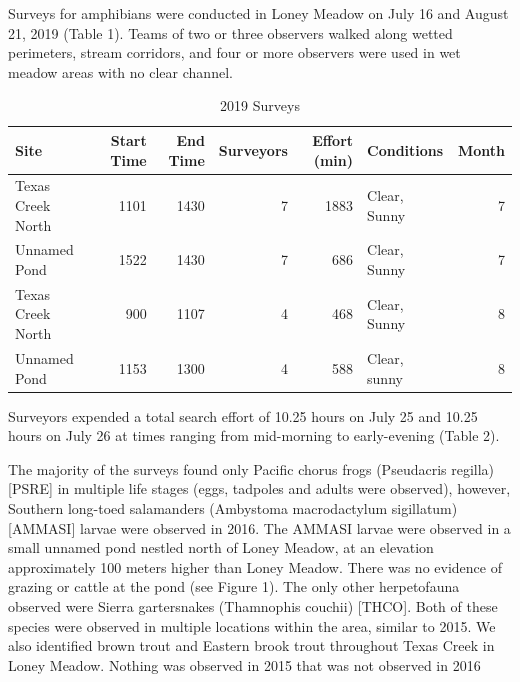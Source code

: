 \documentclass[11pt,a4paper,]{article}
\begin{document}
Surveys for amphibians were conducted in Loney Meadow on July 16 and August 21, 2019 (Table 1). Teams of two or three observers walked along wetted perimeters, stream corridors, and four or more observers were used in wet meadow areas with no clear channel.

\begin{table}

\caption{\label{tab:table1}2019 Surveys}
\centering
\begin{tabular}[t]{l|r|r|r|r|l|r}
\hline
Site & Start Time & End Time & Surveyors & Effort (min) & Conditions & Month\\
\hline
Texas Creek North & 1101 & 1430 & 7 & 1883 & Clear, Sunny & 7\\
\hline
Unnamed Pond & 1522 & 1430 & 7 & 686 & Clear, Sunny & 7\\
\hline
Texas Creek North & 900 & 1107 & 4 & 468 & Clear, Sunny & 8\\
\hline
Unnamed Pond & 1153 & 1300 & 4 & 588 & Clear, sunny & 8\\
\hline
\end{tabular}
\end{table}

Surveyors expended a total search effort of 10.25 hours on July 25 and 10.25 hours on July 26 at times ranging from mid-morning to early-evening (Table 2).

The majority of the surveys found only Pacific chorus frogs (Pseudacris regilla) {[}PSRE{]} in multiple life stages (eggs, tadpoles and adults were observed), however, Southern long-toed salamanders (Ambystoma macrodactylum sigillatum) {[}AMMASI{]} larvae were observed in 2016. The AMMASI larvae were observed in a small unnamed pond nestled north of Loney Meadow, at an elevation approximately 100 meters higher than Loney Meadow. There was no evidence of grazing or cattle at the pond (see Figure 1). The only other herpetofauna observed were Sierra gartersnakes (Thamnophis couchii) {[}THCO{]}. Both of these species were observed in multiple locations within the area, similar to 2015. We also identified brown trout and Eastern brook trout throughout Texas Creek in Loney Meadow. Nothing was observed in 2015 that was not observed in 2016

\printbibliography
\end{document}
